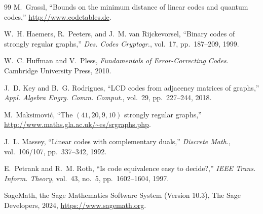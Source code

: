 \documentclass[a4paper,11pt]{article}
\theoremstyle{remark}
\begin{document}
\begin{thebibliography}{99}
M.~Grassl,
``Bounds on the minimum distance of linear codes and quantum codes,''
\url{http://www.codetables.de}.

W.~H. Haemers, R.~Peeters, and J.~M. van Rijckevorsel,
``Binary codes of strongly regular graphs,''
\emph{Des. Codes Cryptogr.}, vol.~17, pp.~187--209, 1999.

W.~C. Huffman and V.~Pless, \emph{Fundamentals of Error-Correcting Codes}. Cambridge University Press, 2010.

J.~D. Key and B.~G. Rodrigues,
``LCD codes from adjacency matrices of graphs,''
\emph{Appl. Algebra Engrg. Comm. Comput.}, vol.~29, pp.~227--244, 2018.

M.~Maksimović,
``The $(41,20,9,10)$ strongly regular graphs,''
\url{http://www.maths.gla.ac.uk/~es/srgraphs.php}.

J.~L. Massey,
``Linear codes with complementary duals,''
\emph{Discrete Math.}, vol.~106/107, pp.~337--342, 1992.

E.~Petrank and R.~M. Roth,
``Is code equivalence easy to decide?,''
\emph{IEEE Trans. Inform. Theory}, vol.~43, no.~5, pp.~1602--1604, 1997.

SageMath, the Sage Mathematics Software System (Version 10.3),
The Sage Developers, 2024, \url{https://www.sagemath.org}.

\end{thebibliography}
\end{document}
